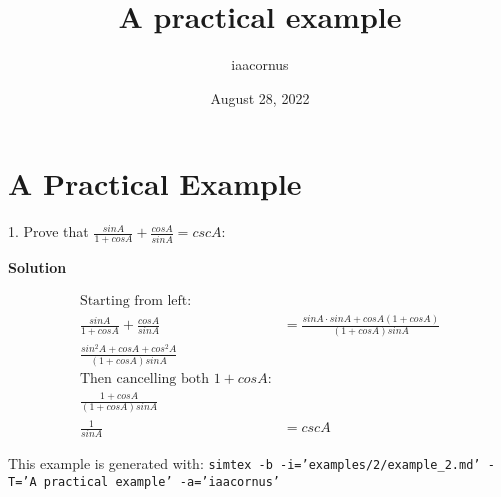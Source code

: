 \documentclass[12pt, UTF8]{article}
\title{A practical example}
\author{iaacornus}
\date{August 28, 2022}
\begin{document}
	\maketitle
	\section{A Practical Example}
	
	1. Prove that $\frac{sin A}{1 + cos A} + \frac{cos A}{sin A} = csc A$:
	
	\textbf{Solution}
	
	\begin{align}
		\text{Starting from left:} \\
		\frac{sin A}{1 + cos A} + \frac{cos A}{sin A} &= \frac{sin A \cdot sin A + cos A (1 + cos A)}{(1 + cos A) sin A} \\
		\frac{sin^2 A + cos A + cos^2 A}{(1 + cos A) sin A} \\
		\text{Then cancelling both $1 + cos A$:} \\
		\frac{1 + cos A}{(1 + cos A) sin A} \\
		\frac{1}{sin A} &= csc A 
	\end{align}
	
	This example is generated with: \texttt{simtex -b -i='examples/2/example\_2.md'  -T='A practical example' -a='iaacornus'}
\end{document}
